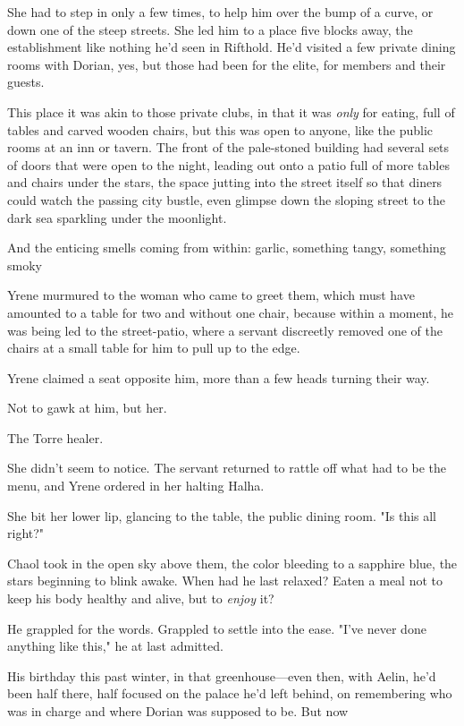 She had to step in only a few times, to help him over the bump of a curve, or down one of the steep streets. She led him to a place five blocks away, the establishment like nothing he'd seen in Rifthold. He'd visited a few private dining rooms with Dorian, yes, but those had been for the elite, for members and their guests.

This place  it was akin to those private clubs, in that it was
\emph{only} for eating, full of tables and carved wooden chairs, but this was open to anyone, like the public rooms at an inn or tavern. The front of the pale-stoned building had several sets of doors that were open to the night, leading out onto a patio full of more tables and chairs under the stars, the space jutting into the street itself so that diners could watch the passing city bustle, even glimpse down the sloping street to the dark sea sparkling under the moonlight.

And the enticing smells coming from within: garlic, something tangy, something smoky 

Yrene murmured to the woman who came to greet them, which must have amounted to a table for two and without one chair, because within a moment, he was being led to the street-patio, where a servant discreetly removed one of the chairs at a small table for him to pull up to the edge.

Yrene claimed a seat opposite him, more than a few heads turning their way.

Not to gawk at him, but her.

The Torre healer.

She didn't seem to notice. The servant returned to rattle off what had to be the menu, and Yrene ordered in her halting Halha.

She bit her lower lip, glancing to the table, the public dining room. "Is this all right?"

Chaol took in the open sky above them, the color bleeding to a sapphire blue, the stars beginning to blink awake. When had he last relaxed? Eaten a meal not to keep his body healthy and alive, but to \emph{enjoy}
it?

He grappled for the words. Grappled to settle into the ease. "I've never done anything like this," he at last admitted.

His birthday this past winter, in that greenhouse---even then, with Aelin, he'd been half there, half focused on the palace he'd left behind, on remembering who was in charge and where Dorian was supposed to be. But now 

